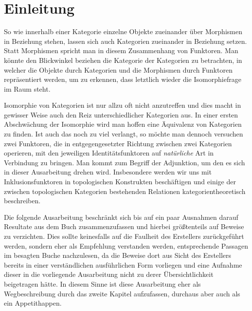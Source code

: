 \section*{Einleitung}

So wie innerhalb einer Kategorie einzelne Objekte zueinander über Morphismen in Beziehung stehen, lassen sich auch Kategorien zueinander in Beziehung setzen. Statt Morphismen spricht man in diesem Zusammenhang von Funktoren. Man könnte den Blickwinkel beziehen die Kategorie der Kategorien zu betrachten, in welcher die Objekte durch Kategorien und die Morphismen durch Funktoren repräsentiert werden, um zu erkennen, dass letztlich wieder die Isomorphiefrage im Raum steht.

Isomorphie von Kategorien ist nur allzu oft nicht anzutreffen und dies macht in gewisser Weise auch den Reiz unterschiedlicher Kategorien aus. In einer ersten Abschwächung der Isomorphie wird man hoffen eine Äquivalenz von Kategorien zu finden. Ist auch das noch zu viel verlangt, so möchte man dennoch versuchen zwei Funktoren, die in entgegengesetzter Richtung zwischen zwei Kategorien operieren, mit den jeweiligen Identitätsfunktoren auf \emph{natürliche} Art in Verbindung zu bringen. Man kommt zum Begriff der Adjunktion, um den es sich in dieser Ausarbeitung drehen wird. Insbesondere werden wir uns mit Inklusionsfunktoren in topologischen Konstrukten beschäftigen und einige der zwischen topologischen Kategorien bestehenden Relationen kategorientheoretisch beschreiben.

Die folgende Ausarbeitung beschränkt sich bis auf ein paar Ausnahmen darauf Resultate aus dem Buch \cite{preuss} zusammenzufassen und hierbei größtenteils auf Beweise zu verzichten. 
Dies sollte keinesfalls auf die Faulheit des Erstellers zurückgeführt werden, sondern eher als Empfehlung verstanden werden, entsprechende Passagen im besagten Buche nachzulesen, da die Beweise dort aus Sicht des Erstellers bereits in einer verständlichen ausführlichen Form vorliegen und eine Aufnahme dieser in die vorliegende Ausarbeitung nicht zu derer Übersichtlichkeit beigetragen hätte.
In diesem Sinne ist diese Ausarbeitung eher als Wegbeschreibung durch das zweite Kapitel aufzufassen, durchaus aber auch als ein Appetithappen.
